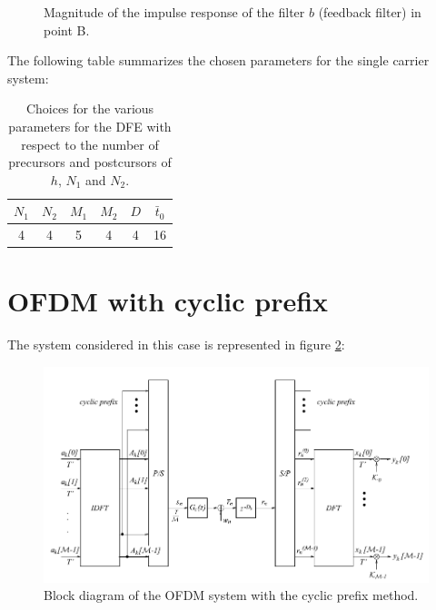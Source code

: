 \documentclass[a4paper,11.5pt]{article}
\begin{document}
\begin{figure}[H]
	\begin{center}   
		\caption{Magnitude of the impulse response of the filter $b$ (feedback filter) in point B.}
		\label{fig:B_b}
	\end{center}
\end{figure}


The following table summarizes the chosen parameters for the single carrier system:

\begin{table}[htbp]
	\begin{center}
		\begin{tabular}{cccccc}
			\toprule
			$N_1$ & $N_2$ & $M_1$ & $M_2$ & $D$ & $\bar{t}_0$ \\
			\midrule
			 4  &  4  & 5 & 4  & 4 & 16 \\
			\bottomrule
		\end{tabular}
	\end{center}
	\label{tab:sumup}
	\caption{Choices for the various parameters for the DFE with respect to the number of precursors and postcursors of $h$, $N_1$ and $N_2$.}
\end{table} 



\section*{OFDM with cyclic prefix}

The system considered in this case is represented in figure \ref{fig:ofdm_schema}:

\begin{figure}[H]
	\begin{center}   
		\includegraphics[width=\textwidth]{figs/OFDM_schema.png} 
		\caption{Block diagram of the OFDM system with the cyclic prefix method.}
		\label{fig:ofdm_schema}
	\end{center}
\end{figure}
\end{document}
